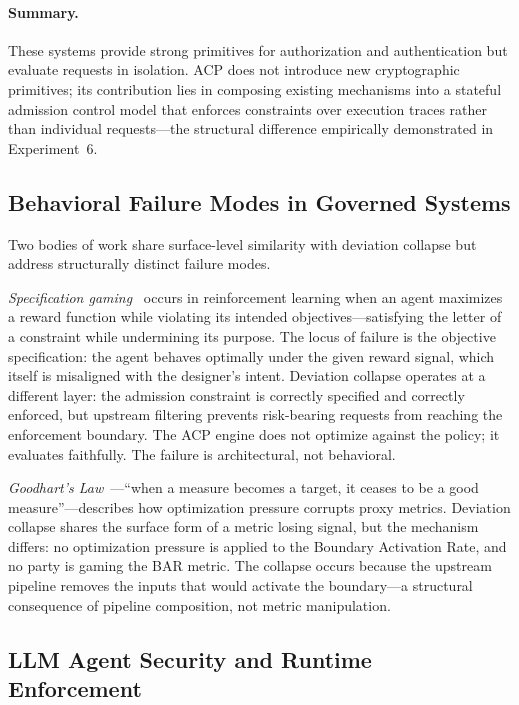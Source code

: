 \documentclass[11pt]{article}
\theoremstyle{definition}
\begin{document}
\paragraph{Summary.}
These systems provide strong primitives for authorization and authentication but evaluate
requests in isolation.
ACP does not introduce new cryptographic primitives; its contribution lies in composing
existing mechanisms into a stateful admission control model that enforces constraints over
execution traces rather than individual requests---the structural difference empirically
demonstrated in Experiment~6.

\subsection{Behavioral Failure Modes in Governed Systems}

Two bodies of work share surface-level similarity with deviation collapse but address structurally distinct failure modes.

\emph{Specification gaming}~\cite{krakovna2020specification} occurs in reinforcement
learning when an agent maximizes a reward function while violating its intended
objectives---satisfying the letter of a constraint while undermining its purpose.
The locus of failure is the objective specification: the agent behaves optimally
under the given reward signal, which itself is misaligned with the designer's intent.
Deviation collapse operates at a different layer: the admission constraint is
correctly specified and correctly enforced, but upstream filtering prevents
risk-bearing requests from reaching the enforcement boundary.
The ACP engine does not optimize against the policy; it evaluates faithfully.
The failure is architectural, not behavioral.

\emph{Goodhart's Law}~\cite{goodhart1975monetary, strathern1997improving}---``when
a measure becomes a target, it ceases to be a good measure''---describes how
optimization pressure corrupts proxy metrics.
Deviation collapse shares the surface form of a metric losing signal, but the
mechanism differs: no optimization pressure is applied to the Boundary Activation
Rate, and no party is gaming the BAR metric.
The collapse occurs because the upstream pipeline removes the inputs that would
activate the boundary---a structural consequence of pipeline composition, not
metric manipulation.

\subsection{LLM Agent Security and Runtime Enforcement}
\end{document}
